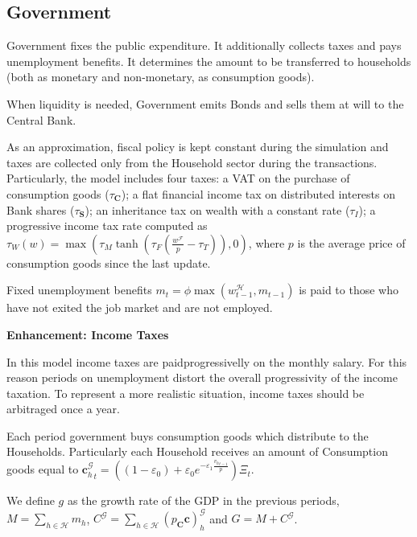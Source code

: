 \documentclass[a4paper, headings=standardclasses]{scrartcl}
\newenvironment{enh}[1][]{\begin{framed}\noindent\textbf{Enhancement: #1}\par}{\end{framed}}
\begin{document}
\subsection{Government}
Government fixes the public expenditure. It additionally collects taxes and pays unemployment benefits. It determines the amount to be transferred to households (both as monetary and non-monetary, as consumption goods).

When liquidity is needed, Government emits Bonds and sells them at will to the Central Bank.

As an approximation, fiscal policy is kept constant during the simulation and taxes are collected only from the Household sector during the transactions. Particularly, the model includes four taxes: a VAT on the purchase of consumption goods ($\tau_\mathbf{C}$); a flat financial income tax on distributed interests on Bank shares ($\tau_\mathbf{S}$); an inheritance tax on wealth with a constant rate ($\tau_I$); a progressive income tax rate computed as $\tau_W(w) = \max(\tau_M \tanh(\tau_F (\frac{w^\mathcal{F}}{p} - \tau_T)),0)$, where $p$ is the average price of consumption goods since the last update. %

Fixed unemployment benefits $m_{t} = \phi \max(w^\mathcal{H}_{t-1}, m_{t-1})$ is paid to those who have not exited the job market and are not employed.

\begin{enh}[Income Taxes]
    In this model income taxes are paidprogressivelly on the monthly salary. For this reason periods on unemployment distort the overall progressivity of the income taxation. To represent a more realistic situation, income taxes should be arbitraged once a year.
\end{enh}

Each period government buys consumption goods which distribute to the Households. Particularly each Household receives an amount of Consumption goods equal to ${\mathbf{c}^\mathcal{G}_h}_t = ((1 - \varepsilon_0) + \varepsilon_0 e^{-\varepsilon_1\frac{{v_h}_{t-1}}{p}})\Xi_t$.

We define $g$ as the growth rate of the GDP %
in the previous periods, $M = \sum_{h \in \mathcal{H}} m_h$, $C^\mathcal{G}= \sum_{h \in \mathcal{H}} (p_\mathbf{C} \mathbf{c})^\mathcal{G}_h$ and $G = M + C^\mathcal{G}$.
\end{document}
